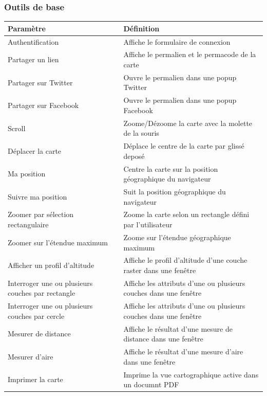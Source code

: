 \documentclass[letterpaper,10pt,french]{sphinxmanual}
\begin{document}
\subsubsection{Outils de base}
\label{apps/appconfig:outils-de-base}
\begin{tabulary}{\linewidth}{|L|L|}
\hline

\textbf{Paramètre}
 & 
\textbf{Définition}
\\
\hline
Authentification
 & 
Affiche le formulaire de connexion
\\
\hline
Partager un lien
 & 
Affiche le permalien et le permacode de la carte
\\
\hline
Partager sur Twitter
 & 
Ouvre le permalien dans une popup Twitter
\\
\hline
Partager sur Facebook
 & 
Ouvre le permalien dans une popup Facebook
\\
\hline
Scroll
 & 
Zoome/Dézoome la carte avec la molette de la souris
\\
\hline
Déplacer la carte
 & 
Déplace le centre de la carte par glissé deposé
\\
\hline
Ma position
 & 
Centre la carte sur la position géographique du navigateur
\\
\hline
Suivre ma position
 & 
Suit la position géographique du navigateur
\\
\hline
Zoomer par sélection rectangulaire
 & 
Zoome la carte selon un rectangle défini par l'utilisateur
\\
\hline
Zoomer sur l'étendue maximum
 & 
Zoome sur l'étendue géographique maximum
\\
\hline
Afficher un profil d'altitude
 & 
Affiche le profil d'altitude d'une couche raster dans une fenêtre
\\
\hline
Interroger une ou plusieurs couches par rectangle
 & 
Affiche les attributs d'une ou plusieurs couches dans une fenêtre
\\
\hline
Interroger une ou plusieurs couches par cercle
 & 
Affiche les attributs d'une ou plusieurs couches dans une fenêtre
\\
\hline
Mesurer de distance
 & 
Affiche le résultat d'une mesure de distance dans une fenêtre
\\
\hline
Mesurer d'aire
 & 
Affiche le résultat d'une mesure d'aire dans une fenêtre
\\
\hline
Imprimer la carte
 & 
Imprime la vue cartographique active dans un documnt PDF
\\
\hline\end{tabulary}
\end{document}
